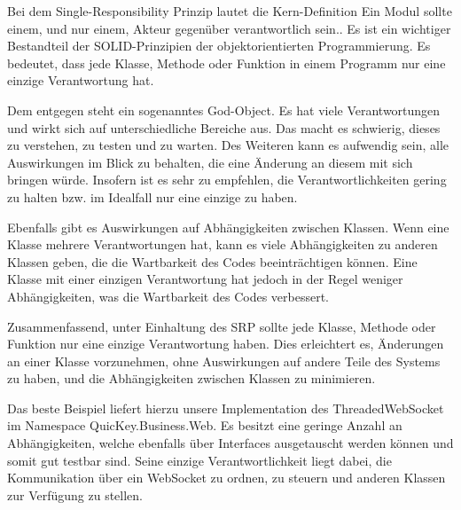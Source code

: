 Bei dem Single-Responsibility Prinzip lautet die Kern-Definition \glqq Ein Modul sollte einem, und nur einem, Akteur gegenüber verantwortlich sein.\grqq{}. Es ist ein wichtiger Bestandteil der SOLID-Prinzipien der objektorientierten Programmierung. Es bedeutet, dass jede Klasse, Methode oder Funktion in einem Programm nur eine einzige Verantwortung hat.

Dem entgegen steht ein sogenanntes God-Object. Es hat viele Verantwortungen und wirkt sich auf unterschiedliche Bereiche aus.
Das macht es schwierig, dieses zu verstehen, zu testen und zu warten. Des Weiteren kann es aufwendig sein, alle Auswirkungen im Blick zu behalten, die eine Änderung an diesem mit sich bringen würde. Insofern ist es sehr zu empfehlen, die Verantwortlichkeiten gering zu halten bzw. im Idealfall nur eine einzige zu haben.

Ebenfalls gibt es Auswirkungen auf Abhängigkeiten zwischen Klassen. Wenn eine Klasse mehrere Verantwortungen hat, kann es viele Abhängigkeiten zu anderen Klassen geben, die die Wartbarkeit des Codes beeinträchtigen können. Eine Klasse mit einer einzigen Verantwortung hat jedoch in der Regel weniger Abhängigkeiten, was die Wartbarkeit des Codes verbessert.

Zusammenfassend, unter Einhaltung des SRP sollte jede Klasse, Methode oder Funktion nur eine einzige Verantwortung haben. Dies erleichtert es, Änderungen an einer Klasse vorzunehmen, ohne Auswirkungen auf andere Teile des Systems zu haben, und die Abhängigkeiten zwischen Klassen zu minimieren.

Das beste Beispiel liefert hierzu unsere Implementation des ThreadedWebSocket im Namespace QuicKey.Business.Web. Es besitzt eine geringe Anzahl an Abhängigkeiten, welche ebenfalls über Interfaces ausgetauscht werden können und somit gut testbar sind. Seine einzige Verantwortlichkeit liegt dabei, die Kommunikation über ein WebSocket zu ordnen, zu steuern und anderen Klassen zur Verfügung zu stellen.